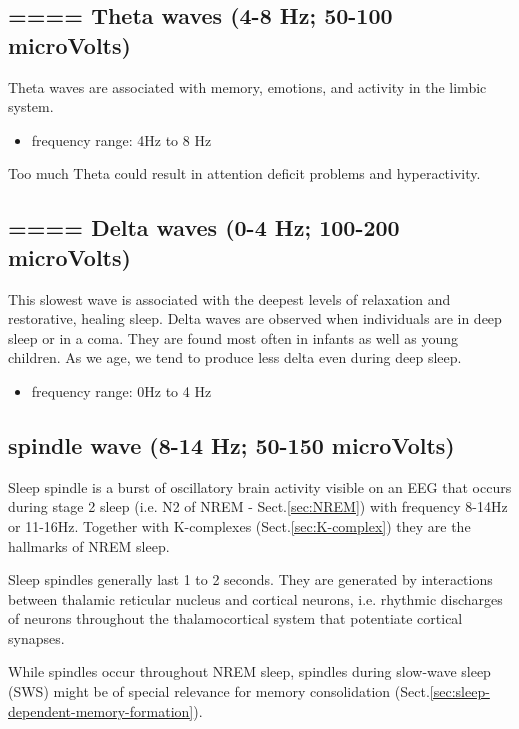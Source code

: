 \subsection{====  Theta waves (4-8 Hz; 50-100 microVolts)}
\label{sec:frequencies-theta}
\label{sec:theta-wave}

Theta waves are associated with memory, emotions, and activity in the limbic
system. 
\begin{itemize}
  \item frequency range: 4Hz to 8 Hz
\end{itemize}

Too much Theta could result in attention deficit problems and hyperactivity. 


\subsection{====  Delta waves (0-4 Hz; 100-200 microVolts)}
\label{sec:frequencies-delta}
\label{sec:delta-wave}

This slowest wave is associated with the deepest levels of relaxation and
restorative, healing sleep. Delta waves are observed when individuals are in
deep sleep or in a coma. They are found most often in infants as well as young
children. As we age, we tend to produce less delta even during deep sleep.

\begin{itemize}
  \item frequency range: 0Hz to 4 Hz
\end{itemize}


\subsection{spindle wave (8-14 Hz; 50-150 microVolts)}
\label{sec:spindle-wave}

Sleep spindle is a burst of oscillatory brain activity visible on an EEG that
occurs during stage 2 sleep (i.e. N2 of NREM - Sect.\ref{sec:NREM}) with
frequency 8-14Hz or 11-16Hz. Together with K-complexes
(Sect.\ref{sec:K-complex}) they are the hallmarks of NREM sleep. 

Sleep spindles generally last 1 to 2 seconds. They are generated by interactions
between thalamic reticular nucleus and cortical neurons, i.e. rhythmic
discharges of neurons throughout the thalamocortical system that potentiate
cortical synapses.

While spindles occur throughout NREM sleep, spindles during slow-wave sleep
(SWS) might be of special relevance for memory consolidation
(Sect.\ref{sec:sleep-dependent-memory-formation}).



